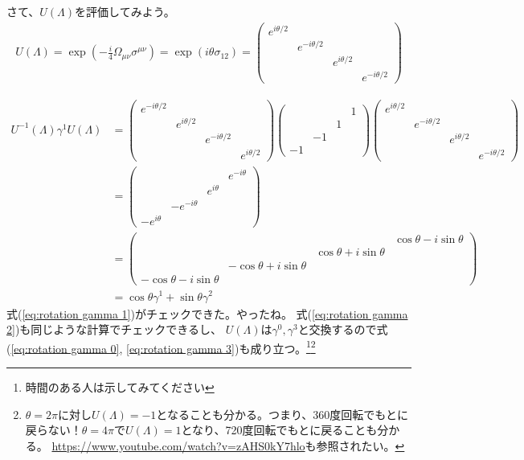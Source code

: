 \documentclass[10pt,a4paper]{jarticle}
\begin{document}
%
さて、$U(\Lambda)$を評価してみよう。
\begin{align}
U(\Lambda)
=
\exp\left( -\frac{i}{4} \Omega_{\mu\nu} \sigma^{\mu\nu} \right)
=
\exp\left( i \theta \sigma_{12} \right)
=
\left(\begin{array}{cccc}
e^{i\theta/2} &&& \\
& e^{-i\theta/2} && \\
&& e^{i\theta/2} & \\
&&& e^{-i\theta/2} 
\end{array}\right)
\end{align}
%

\begin{align}
U^{-1}(\Lambda) \gamma^1 U(\Lambda)
&=
\left(\begin{array}{cccc}
e^{-i\theta/2} &&& \\
& e^{i\theta/2} && \\
&& e^{-i\theta/2} & \\
&&& e^{i\theta/2} 
\end{array}\right)
%
\left(\begin{array}{cccc}
&&&1\\
&&1&\\
&-1&&\\
-1&&&
\end{array}\right)
%
\left(\begin{array}{cccc}
e^{i\theta/2} &&& \\
& e^{-i\theta/2} && \\
&& e^{i\theta/2} & \\
&&& e^{-i\theta/2} 
\end{array}\right) \nonumber\\
%
&=
\left(\begin{array}{cccc}
&&&e^{-i\theta}\\
&&e^{i\theta}&\\
&-e^{-i\theta}&&\\
-e^{i\theta}&&&
\end{array}\right) \nonumber\\
&=
\left(\begin{array}{cccc}
&&& \cos\theta - i\sin\theta \\
&&\cos\theta + i\sin\theta&\\
&-\cos\theta + i\sin\theta&&\\
-\cos\theta - i\sin\theta&&&
\end{array}\right) \nonumber\\
&=
\cos\theta \gamma^1 + \sin\theta \gamma^2
\end{align}
式(\ref{eq:rotation gamma 1})がチェックできた。やったね。
式(\ref{eq:rotation gamma 2})も同じような計算でチェックできるし、
$U(\Lambda)$は$\gamma^0, \gamma^3$と交換するので式(\ref{eq:rotation gamma 0}, \ref{eq:rotation gamma 3})も成り立つ。\footnote{時間のある人は示してみてください}\footnote{
$\theta = 2\pi$に対し$U(\Lambda) = -1$となることも分かる。つまり、360度回転でもとに戻らない！$\theta = 4\pi$で$U(\Lambda) = 1$となり、720度回転でもとに戻ることも分かる。
\url{https://www.youtube.com/watch?v=zAHS0kY7hlo}も参照されたい。
}
\end{document}

